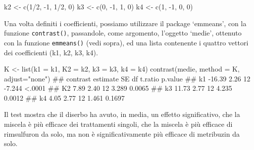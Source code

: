 \documentclass[a4paper,12pt,oneside]{book}
\newenvironment{Shaded}{\begin{snugshade}}{\end{snugshade}}
\newcommand{\DecValTok}[1]{#1}
\newcommand{\SpecialCharTok}[1]{#1}
\newcommand{\StringTok}[1]{#1}
\newcommand{\DocumentationTok}[1]{#1}
\newcommand{\OtherTok}[1]{#1}
\newcommand{\FunctionTok}[1]{#1}
\newcommand{\AttributeTok}[1]{#1}
\newcommand{\NormalTok}[1]{#1}
\begin{document}
\begin{Shaded}
\begin{Highlighting}[]
\NormalTok{k2 }\OtherTok{\textless{}{-}} \FunctionTok{c}\NormalTok{(}\DecValTok{1}\SpecialCharTok{/}\DecValTok{2}\NormalTok{, }\SpecialCharTok{{-}}\DecValTok{1}\NormalTok{, }\DecValTok{1}\SpecialCharTok{/}\DecValTok{2}\NormalTok{, }\DecValTok{0}\NormalTok{)}
\NormalTok{k3 }\OtherTok{\textless{}{-}} \FunctionTok{c}\NormalTok{(}\DecValTok{0}\NormalTok{, }\SpecialCharTok{{-}}\DecValTok{1}\NormalTok{, }\DecValTok{1}\NormalTok{, }\DecValTok{0}\NormalTok{)}
\NormalTok{k4 }\OtherTok{\textless{}{-}} \FunctionTok{c}\NormalTok{(}\DecValTok{1}\NormalTok{, }\SpecialCharTok{{-}}\DecValTok{1}\NormalTok{, }\DecValTok{0}\NormalTok{, }\DecValTok{0}\NormalTok{)}
\end{Highlighting}
\end{Shaded}

Una volta definiti i coefficienti, possiamo utilizzare il package `emmeans', con la funzione \texttt{contrast()}, passandole, come argomento, l'oggetto `medie', ottenuto con la funzione \texttt{emmeans()} (vedi sopra), ed una lista contenente i quattro vettori dei coefficienti (k1, k2, k3, k4).

\small

\begin{Shaded}
\begin{Highlighting}[]
\NormalTok{K }\OtherTok{\textless{}{-}} \FunctionTok{list}\NormalTok{(}\AttributeTok{k1 =}\NormalTok{ k1, }\AttributeTok{K2 =}\NormalTok{ k2, }\AttributeTok{k3 =}\NormalTok{ k3, }\AttributeTok{k4 =}\NormalTok{ k4)}
\FunctionTok{contrast}\NormalTok{(medie, }\AttributeTok{method =}\NormalTok{ K, }\AttributeTok{adjust=}\StringTok{"none"}\NormalTok{)}
\DocumentationTok{\#\#  contrast estimate   SE df t.ratio p.value}
\DocumentationTok{\#\#  k1         {-}16.39 2.26 12  {-}7.244  \textless{}.0001}
\DocumentationTok{\#\#  K2           7.89 2.40 12   3.289  0.0065}
\DocumentationTok{\#\#  k3          11.73 2.77 12   4.235  0.0012}
\DocumentationTok{\#\#  k4           4.05 2.77 12   1.461  0.1697}
\end{Highlighting}
\end{Shaded}

\normalsize

Il test mostra che il diserbo ha avuto, in media, un effetto significativo, che la miscela è più efficace dei trattamenti singoli, che la miscela è più efficace di rimsulfuron da solo, ma non è significativamente più efficace di metribuzin da solo.
\end{document}

